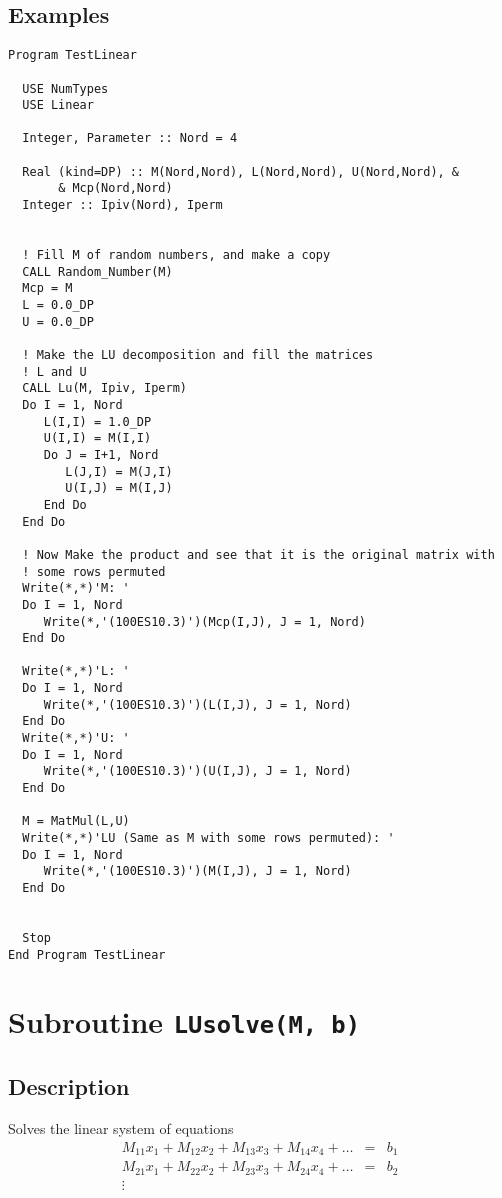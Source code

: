 \subsection{Examples}

\begin{verbatim}
Program TestLinear

  USE NumTypes
  USE Linear

  Integer, Parameter :: Nord = 4

  Real (kind=DP) :: M(Nord,Nord), L(Nord,Nord), U(Nord,Nord), &
       & Mcp(Nord,Nord)
  Integer :: Ipiv(Nord), Iperm

  
  ! Fill M of random numbers, and make a copy
  CALL Random_Number(M)
  Mcp = M
  L = 0.0_DP
  U = 0.0_DP

  ! Make the LU decomposition and fill the matrices 
  ! L and U
  CALL Lu(M, Ipiv, Iperm)
  Do I = 1, Nord
     L(I,I) = 1.0_DP
     U(I,I) = M(I,I)
     Do J = I+1, Nord
        L(J,I) = M(J,I)
        U(I,J) = M(I,J)
     End Do
  End Do

  ! Now Make the product and see that it is the original matrix with
  ! some rows permuted
  Write(*,*)'M: '
  Do I = 1, Nord
     Write(*,'(100ES10.3)')(Mcp(I,J), J = 1, Nord)
  End Do

  Write(*,*)'L: '
  Do I = 1, Nord
     Write(*,'(100ES10.3)')(L(I,J), J = 1, Nord)
  End Do
  Write(*,*)'U: '
  Do I = 1, Nord
     Write(*,'(100ES10.3)')(U(I,J), J = 1, Nord)
  End Do

  M = MatMul(L,U)
  Write(*,*)'LU (Same as M with some rows permuted): '
  Do I = 1, Nord
     Write(*,'(100ES10.3)')(M(I,J), J = 1, Nord)
  End Do


  Stop
End Program TestLinear
\end{verbatim}

\section{Subroutine \texttt{LUsolve(M, b)}}

\subsection{Description}
Solves the linear system of equations
\begin{eqnarray}
  M_{11}x_1 + M_{12}x_2 + M_{13}x_3 + M_{14}x_4 + \dots & = & b_1 \\
  \nonumber
  M_{21}x_1 + M_{22}x_2 + M_{23}x_3 + M_{24}x_4 + \dots & = & b_2 \\
  \nonumber
  \vdots & & 
\end{eqnarray}

